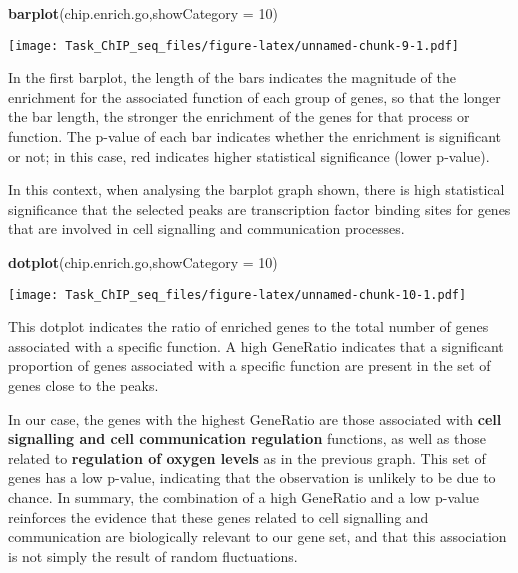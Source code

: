\documentclass[
]{article}
\newenvironment{Shaded}{\begin{snugshade}}{\end{snugshade}}
\newcommand{\AttributeTok}[1]{\textcolor[rgb]{0.13,0.29,0.53}{#1}}
\newcommand{\DecValTok}[1]{\textcolor[rgb]{0.00,0.00,0.81}{#1}}
\newcommand{\FunctionTok}[1]{\textcolor[rgb]{0.13,0.29,0.53}{\textbf{#1}}}
\newcommand{\NormalTok}[1]{#1}
\begin{document}
\begin{Shaded}
\begin{Highlighting}[]
\FunctionTok{barplot}\NormalTok{(chip.enrich.go,}\AttributeTok{showCategory =} \DecValTok{10}\NormalTok{)}
\end{Highlighting}
\end{Shaded}

\texttt{[image: Task\_ChIP\_seq\_files/figure-latex/unnamed-chunk-9-1.pdf]}

In the first barplot, the length of the bars indicates the magnitude of
the enrichment for the associated function of each group of genes, so
that the longer the bar length, the stronger the enrichment of the genes
for that process or function. The p-value of each bar indicates whether
the enrichment is significant or not; in this case, red indicates higher
statistical significance (lower p-value).

In this context, when analysing the barplot graph shown, there is high
statistical significance that the selected peaks are transcription
factor binding sites for genes that are involved in cell signalling and
communication processes.

\begin{Shaded}
\begin{Highlighting}[]
\FunctionTok{dotplot}\NormalTok{(chip.enrich.go,}\AttributeTok{showCategory =} \DecValTok{10}\NormalTok{)}
\end{Highlighting}
\end{Shaded}

\texttt{[image: Task\_ChIP\_seq\_files/figure-latex/unnamed-chunk-10-1.pdf]}

This dotplot indicates the ratio of enriched genes to the total number
of genes associated with a specific function. A high GeneRatio indicates
that a significant proportion of genes associated with a specific
function are present in the set of genes close to the peaks.

In our case, the genes with the highest GeneRatio are those associated
with \textbf{cell signalling and cell communication regulation}
functions, as well as those related to \textbf{regulation of oxygen
levels} as in the previous graph. This set of genes has a low p-value,
indicating that the observation is unlikely to be due to chance. In
summary, the combination of a high GeneRatio and a low p-value
reinforces the evidence that these genes related to cell signalling and
communication are biologically relevant to our gene set, and that this
association is not simply the result of random fluctuations.
\end{document}
